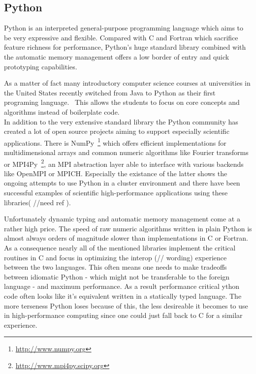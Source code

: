 \subsection*{Python}
\label{subsec:State_of_the_art::Candidates::Python}

Python is an interpreted general-purpose programming language which aims to be very expressive and flexible. Compared with C and Fortran which sacrifice feature richness for performance, Python's huge standard library combined with the automatic memory management offers a low border of entry and quick prototyping capabilities.

As a matter of fact many introductory computer science courses at universities in the United States recently switched from Java to Python as their first programing language.~\cite{GUO14, intro_py} This allows the students to focus on core concepts and algorithms instead of boilerplate code.
\\


In addition to the very extensive standard library the Python community has created a lot of open source projects aiming to support especially scientific applications. There is NumPy~\footnote{\url{http://www.numpy.org}} which offers efficient implementations for multidimensional arrays and common numeric algorithms like Fourier transforms or MPI4Py~\footnote{\url{http://www.mpi4py.scipy.org}}, an MPI abstraction layer able to interface with various backends like OpenMPI or MPICH. Especially the existance of the latter shows the ongoing attempts to use Python in a cluster environment and there have been successful examples of scientific high-performance applications using these libraries( //need ref ).

Unfortunately dynamic typing and automatic memory management come at a rather high price. The speed of raw numeric algorithms written in plain Python is almost always orders of magnitude slower than implementations in C or Fortran. As a consequence nearly all of the mentioned libraries implement the critical routines in C and focus in optimizing the interop (// wording) experience between the two languages. This often means one needs to make tradeoffs between idiomatic Python - which might not be transferable to the foreign language - and maximum performance. As a result performance critical ython code often looks like it's equivalent written in a statically typed language. The more terseness Python loses because of this, the less desireable it becomes to use in high-performance computing since one could just fall back to C for a similar experience.

